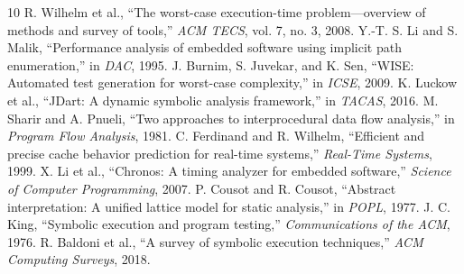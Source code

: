 \documentclass[10pt,conference]{IEEEtran}
\begin{document}
\begin{thebibliography}{10}
 R. Wilhelm et al., ``The worst-case execution-time problem---overview of methods and survey of tools,'' \emph{ACM TECS}, vol. 7, no. 3, 2008.
 Y.-T. S. Li and S. Malik, ``Performance analysis of embedded software using implicit path enumeration,'' in \emph{DAC}, 1995.
 J. Burnim, S. Juvekar, and K. Sen, ``WISE: Automated test generation for worst-case complexity,'' in \emph{ICSE}, 2009.
 K. Luckow et al., ``JDart: A dynamic symbolic analysis framework,'' in \emph{TACAS}, 2016.
 M. Sharir and A. Pnueli, ``Two approaches to interprocedural data flow analysis,'' in \emph{Program Flow Analysis}, 1981.
 C. Ferdinand and R. Wilhelm, ``Efficient and precise cache behavior prediction for real-time systems,'' \emph{Real-Time Systems}, 1999.
 X. Li et al., ``Chronos: A timing analyzer for embedded software,'' \emph{Science of Computer Programming}, 2007.
 P. Cousot and R. Cousot, ``Abstract interpretation: A unified lattice model for static analysis,'' in \emph{POPL}, 1977.
 J. C. King, ``Symbolic execution and program testing,'' \emph{Communications of the ACM}, 1976.
 R. Baldoni et al., ``A survey of symbolic execution techniques,'' \emph{ACM Computing Surveys}, 2018.
\end{thebibliography}
\end{document}
